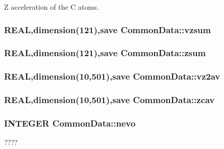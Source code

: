 Z acceleration of the C atoms. \hypertarget{namespace_common_data_a3c7cb8fe8980c16677d67a91d4253347}{
\subsubsection[{vzsum}]{\setlength{\rightskip}{0pt plus 5cm}REAL,dimension(121),save {\bf CommonData::vzsum}}}
\label{namespace_common_data_a3c7cb8fe8980c16677d67a91d4253347}
\hypertarget{namespace_common_data_a0ce423b52c02935927c0328fb2a8a869}{
\subsubsection[{zsum}]{\setlength{\rightskip}{0pt plus 5cm}REAL,dimension(121),save {\bf CommonData::zsum}}}
\label{namespace_common_data_a0ce423b52c02935927c0328fb2a8a869}
\hypertarget{namespace_common_data_a98fb8e9102a9fe8002bca31265299a9a}{
\subsubsection[{vz2av}]{\setlength{\rightskip}{0pt plus 5cm}REAL,dimension(10,501),save {\bf CommonData::vz2av}}}
\label{namespace_common_data_a98fb8e9102a9fe8002bca31265299a9a}
\hypertarget{namespace_common_data_a9ab21d0d353de9bb788831e27d9a5130}{
\subsubsection[{zcav}]{\setlength{\rightskip}{0pt plus 5cm}REAL,dimension(10,501),save {\bf CommonData::zcav}}}
\label{namespace_common_data_a9ab21d0d353de9bb788831e27d9a5130}
\hypertarget{namespace_common_data_a976b903826d3d0278c77a43ee3d29754}{
\subsubsection[{nevo}]{\setlength{\rightskip}{0pt plus 5cm}INTEGER {\bf CommonData::nevo}}}
\label{namespace_common_data_a976b903826d3d0278c77a43ee3d29754}


???? 